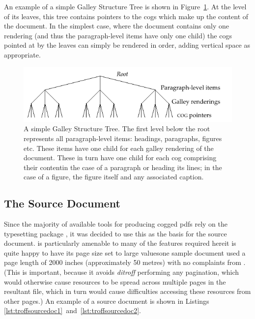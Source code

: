 An example of a simple Galley Structure Tree is shown in Figure~\ref{fig:tree}. At the level of its leaves, this tree contains pointers to the \glspl{cog} which make up the content of the document. In the simplest case, where the document contains only one rendering (and thus the pa\-ra\-graph-level items have only one child) the \glspl{cog} pointed at by the leaves can simply be rendered in order, adding vertical space as appropriate.

\begin{figure}
 \includegraphics[width=\textwidth]{gfx/tree}
 \caption[A simple Galley Structure Tree]{A simple Galley Structure Tree. The first level below the root represents all paragraph-level items: headings, paragraphs, figures etc. These items have one child for each galley rendering of the document. These in turn have one child for each \gls{cog} comprising their content\ed{}in the case of a paragraph or heading its lines; in the case of a figure, the figure itself and any associated caption.}
 \label{fig:tree}
\end{figure}

\subsection{The Source Document}\label{sec:srcdoc}
Since the majority of available tools for producing \gls{cog}ged \glspl{pdf} rely on the typesetting package \ditroff{},\hspace{0pt}\cite{Kernighan1982} it was decided to use this as the basis for the source document. \Ditroff{} is particularly amenable to many of the features required here\ed{}it is quite happy to have its page size set to large values\ed{}one sample document used a page length of 2000 inches (approximately 50 metres) with no complaints from \ditroff{}. (This is important, because it avoids \emph{ditroff} performing any pagination, which would otherwise cause \COG{} resources to be spread across multiple pages in the resultant \pdf{} file, which in turn would cause difficulties accessing these resources from other pages.) An example of a source document is shown in Listings \ref{lst:troffsourcedoc1}~and~\ref{lst:troffsourcedoc2}.



